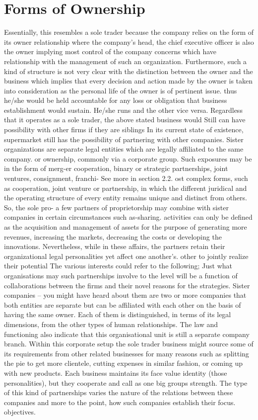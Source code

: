       \section{Forms of Ownership}
     Essentially, this resembles a sole trader because the company relies on the form of its owner relationship where the company’s head, the chief executive officer is also the owner implying most control of the company concerns which have relationship with the management of such an organization. Furthermore, such a kind of structure is not very clear with the distinction between the owner and the business which implies that every decision and action made by the owner is taken into consideration as the personal life of the owner is of pertinent issue. thus he/she would be held accountable for any loss or obligation that business establishment would sustain. He/she runs and the other vice versa. Regardless that it operates as a sole trader, the above stated business would Still can have possibility with other firms if they are siblings In its current state of existence, supermarket still has the possibility of partnering with other companies. Sister organizations are separate legal entities which are legally affiliated to the same company. or ownership, commonly via a corporate group. Such exposures may be in the form of merg-er cooperation, binary or strategic partnerships, joint ventures, consignment, franchi- See more in section 2.2. ost complex forms, such as cooperation, joint venture or partnership, in which the different juridical and the operating structure of every entity remains unique and distinct from others. So, the sole pro- a few partners of proprietorship may combine with sister companies in certain circumstances such as-sharing. activities can only be defined as the acquisition and management of assets for the purpose of generating more revenues, increasing the markets, decreasing the costs or developing the innovations. Nevertheless, while in these affairs, the partners retain their organizational legal personalities yet affect one another’s. other to jointly realize their potential The various interests could refer to the following; Just what organisations may such partnerships involve to the level will be a function of collaborations between the firms and their novel reasons for the strategies. Sister companies – you might have heard about them are two or more companies that both entities are separate but can be affiliated with each other on the basis of having the same owner. Each of them is distinguished, in terms of its legal dimensions, from the other types of human relationships. The law and functioning also indicate that this organisational unit is still a separate company branch. Within this corporate setup the sole trader business might source some of its requirements from other related businesses for many reasons such as splitting the pie to get more clientele, cutting expenses in similar fashion, or coming up with new products. Each business maintains its face value identity (those personalities), but they cooperate and call as one big groups strength. The type of this kind of partnerships varies the nature of the relations between these companies and more to the point, how such companies establish their focus. objectives.
